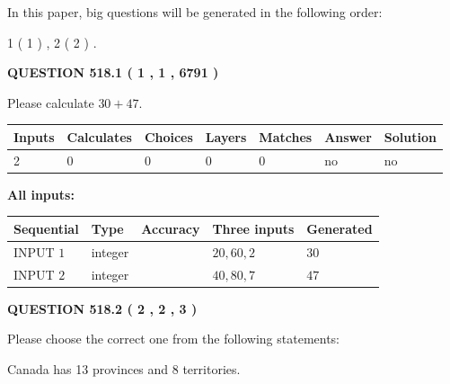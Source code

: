 \documentclass[12pt]{article}
\begin{document}
In this paper, big questions will be generated in the following order: 
   
   
   1 ( 1 )
 ,
   2 ( 2 )
 .
  
\vspace{0.2in}
  
{\textbf{\Large{QUESTION
518.1 
 ( 1 , 1 , 6791 )
}}}
  
  
 
Please calculate $ %
30 +  %
47 $.
 
 
   
   
   
   
\noindent\begin{tabular}{|l|l|l|l|l|l|l|}
 \hline
Inputs & Calculates & Choices & Layers & Matches & Answer & Solution \\ \hline
 2  & 
 0  & 
 0
  & 
 0  & 
 0  & 
  no & 
  no 
  \\ \hline
 \end{tabular}
   
   
   
   
\noindent{}
   
   
   
   
\noindent\vspace{0.1in}\hspace{-0.08in} {\textbf{\Large{All inputs: }}}
   
   
  
  
\noindent\begin{tabular}{|l|l|l|l|l|}
\hline
 Sequential & Type & Accuracy & Three inputs & Generated \\ 
\hline
 
 
  INPUT $  1 $ & integer &  & $
 20
 , 
 60
 , 
 2
 $ & $ 30 $ 
 \\  \hline  
 
 
  INPUT $  2 $ & integer &  & $
 40
 , 
 80
 , 
 7
 $ & $ 47 $ 
 \\  \hline  
 \end{tabular}
   
   
  
\vspace{0.2in}
  
{\textbf{\Large{QUESTION
518.2 
 ( 2 , 2 , 3 )
}}}
  
  
Please choose the correct one from the following statements:
 
 
Canada has  13 provinces and  8 territories.
 
\end{document}
